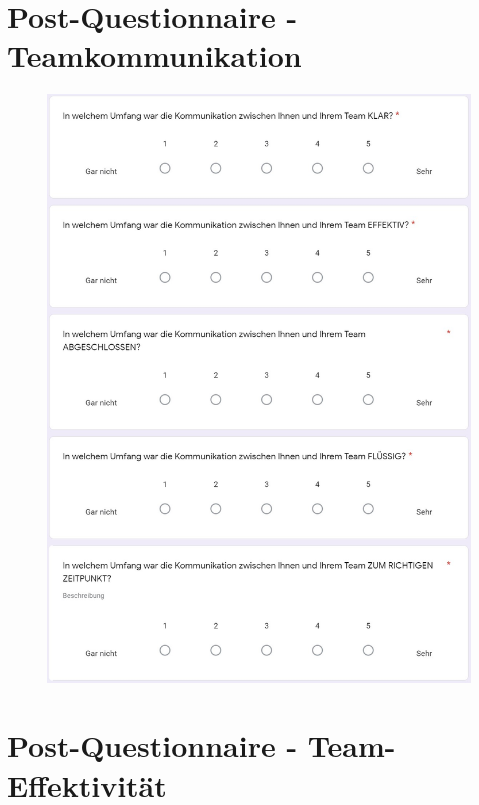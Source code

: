 \documentclass[a4paper,11pt]{article}%
\renewcommand{\\}{\vspace*{0.5\baselineskip} \newline}
\begin{document}
\newpage
\section{Post-Questionnaire - Teamkommunikation}	
\label{Post-Questionnaire - Teamkommunikation}	

\begin{figure}[H]
		\begin{footnotesize}
			\includegraphics[width=\textwidth]{Abbildungen/Fragebogen/Post-Questionnaire/PQKQ1}
		\end{footnotesize}
	\end{figure}	

\newpage
\section{Post-Questionnaire - Team-Effektivität}	
\label{Post-Questionnaire - Team-Effektivität}	
\end{document}
